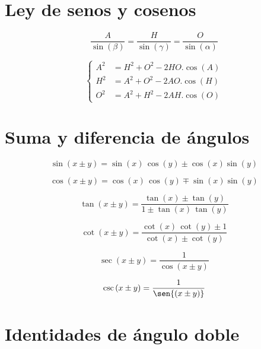 \documentclass[a5paper,12pt,twoside]{book}
\begin{document}
\section{Ley de senos y cosenos}

\begin{equation*}
    \frac{A}{\sin{(\beta)}} = \frac{H}{\sin{(\gamma)}} = \frac{O}{\sin{(\alpha)}}
\end{equation*}

\begin{equation*}
    \left\{
    \begin{aligned}
        A^2 &= H^2+O^2-2HO.\cos{(A)}
        \\
        H^2 &= A^2+O^2-2AO.\cos{(H)}
        \\
        O^2 &= A^2+H^2-2AH.\cos{(O)}
    \end{aligned}
    \right.
\end{equation*}


\section{Suma y diferencia de ángulos}

\begin{equation*}
    \sin{(x \pm y)} = \sin{(x)} \, \cos{(y)} \pm \cos{(x)}\sin{(y)}
\end{equation*}

\begin{equation*}
    \cos{(x \pm y)} = \cos{(x)} \, \cos{(y)} \mp \sin{(x)}\sin{(y)}
\end{equation*}

\begin{equation*}
    \tan{(x \pm y)} = \dfrac{\tan{(x)} \pm \tan{(y)}}{1 \pm \tan{(x)} \, \tan{(y)}}
\end{equation*}

\begin{equation*}
    \cot{(x \pm y)} = \dfrac{\cot{(x)} \, \cot{(y)} \pm1}{\cot{(x)} \pm \cot{(y)}}
\end{equation*}

\begin{equation*}
    \sec{(x \pm y)} = \dfrac{1}{\cos{(x \pm y)}}
\end{equation*}

\begin{equation*}
    \csc{(x \pm y)} = \dfrac{1}{\sen{(x \pm y)}}
\end{equation*}


\section{Identidades de ángulo doble}
\end{document}

